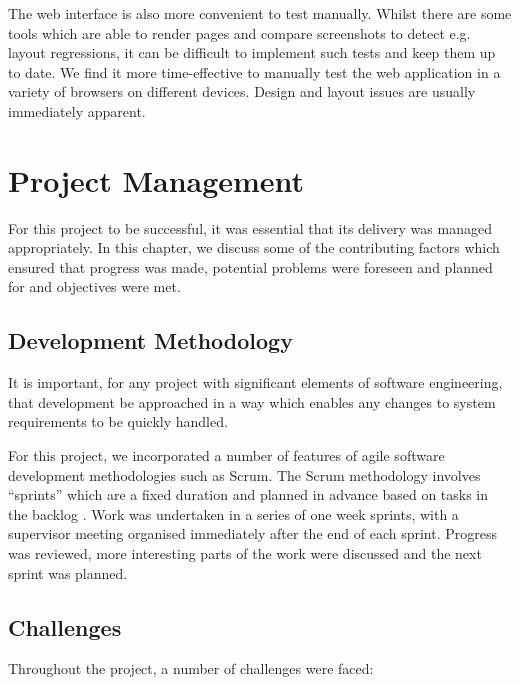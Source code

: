 \documentclass[a4paper,openany,12pt]{book}
\begin{document}
The web interface is also more convenient to test manually.
Whilst there are some tools which are able to render pages and compare screenshots to detect e.g. layout regressions, it can be difficult to implement such tests and keep them up to date.
We find it more time-effective to manually test the web application in a variety of browsers on different devices.
Design and layout issues are usually immediately apparent.

\chapter{Project Management}


For this project to be successful, it was essential that its delivery was managed appropriately.
In this chapter, we discuss some of the contributing factors which ensured that progress was made, potential problems
were foreseen and planned for and objectives were met.

\section{Development Methodology}

It is important, for any project with significant elements of software engineering, that development be approached in a
way which enables any changes to system requirements to be quickly handled.

For this project, we incorporated a number of features of agile software development methodologies such as Scrum.
The Scrum methodology involves ``sprints'' which are a fixed duration and planned in advance based on tasks in the backlog \citep{sutherland2014scrum}.
Work was undertaken in a series of one week sprints, with a supervisor meeting organised immediately after the end
of each sprint.
Progress was reviewed, more interesting parts of the work were discussed and the next sprint was planned.

\section{Challenges}

Throughout the project, a number of challenges were faced:
\end{document}
